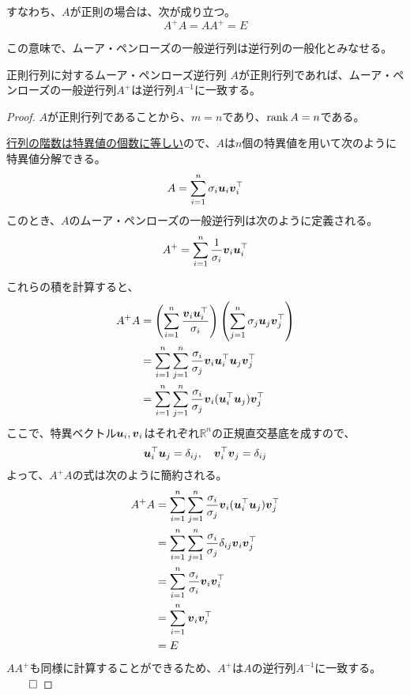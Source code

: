 \documentclass[../../../topic_linear-algebra]{subfiles}
\begin{document}
すなわち、$A$が正則の場合は、次が成り立つ。
\begin{equation*}
  A^+ A = A A^+ = E
\end{equation*}

この意味で、ムーア・ペンローズの一般逆行列は逆行列の一般化とみなせる。

\begin{theorem}{正則行列に対するムーア・ペンローズ逆行列}
  $A$が正則行列であれば、ムーア・ペンローズの一般逆行列$A^+$は逆行列$A^{-1}$に一致する。
\end{theorem}

\begin{proof}
  $A$が正則行列であることから、$m = n$であり、\hyperref[thm:invertible-iff-full-rank]{$\rank A = n$}である。
  
  \hyperref[thm:rank-and-singular-values]{行列の階数は特異値の個数に等しい}ので、$A$は$n$個の特異値を用いて次のように特異値分解できる。
  \begin{equation*}
    A = \sum_{i=1}^{n} \sigma_i \vb*{u}_i \vb*{v}_i^\top
  \end{equation*}
  このとき、$A$のムーア・ペンローズの一般逆行列は次のように定義される。
  \begin{equation*}
    A^+ = \sum_{i=1}^{n} \frac{1}{\sigma_i} \vb*{v}_i \vb*{u}_i^\top
  \end{equation*}
  
  これらの積を計算すると、
  \begin{align*}
    A^+ A & = \left( \sum_{i=1}^{n} \frac{\vb*{v}_i \vb*{u}_i^\top}{\sigma_i} \right) \left( \sum_{j=1}^{n} \sigma_j \vb*{u}_j \vb*{v}_j^\top \right) \\
           & = \sum_{i=1}^{n} \sum_{j=1}^{n} \frac{\sigma_i}{\sigma_j} \vb*{v}_i \vb*{u}_i^\top \vb*{u}_j \vb*{v}_j^\top \\
           & = \sum_{i=1}^{n} \sum_{j=1}^{n} \frac{\sigma_i}{\sigma_j} \vb*{v}_i (\vb*{u}_i^\top \vb*{u}_j) \vb*{v}_j^\top
  \end{align*}
  ここで、特異ベクトル$\vb*{u}_i, \vb*{v}_i$はそれぞれ$\mathbb{R}^n$の正規直交基底を成すので、
  \begin{equation*}
    \vb*{u}_i^\top \vb*{u}_j = \delta_{ij}, \quad
    \vb*{v}_i^\top \vb*{v}_j = \delta_{ij}
  \end{equation*}
  よって、$A^+A$の式は次のように簡約される。
  \begin{align*}
    A^+ A & = \sum_{i=1}^{n} \sum_{j=1}^{n} \frac{\sigma_i}{\sigma_j} \vb*{v}_i (\vb*{u}_i^\top \vb*{u}_j) \vb*{v}_j^\top \\
          & = \sum_{i=1}^{n} \sum_{j=1}^{n} \frac{\sigma_i}{\sigma_j} \delta_{ij} \vb*{v}_i \vb*{v}_j^\top \\
          & = \sum_{i=1}^{n} \frac{\sigma_i}{\sigma_i} \vb*{v}_i \vb*{v}_i^\top \\
          & = \sum_{i=1}^{n} \vb*{v}_i \vb*{v}_i^\top \\
          & = E
  \end{align*}
  $A A^+$も同様に計算することができるため、$A^+$は$A$の逆行列$A^{-1}$に一致する。 $\qed$
\end{proof}
\end{document}
